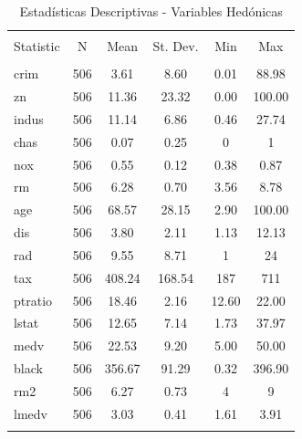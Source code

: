 
\begin{table}[!htbp] \centering 
  \caption{Estadísticas Descriptivas - Variables Hedónicas} 
  \label{} 
\begin{tabular}{@{\extracolsep{5pt}}lccccc} 
\\[-1.8ex]\hline 
\hline \\[-1.8ex] 
Statistic & \multicolumn{1}{c}{N} & \multicolumn{1}{c}{Mean} & \multicolumn{1}{c}{St. Dev.} & \multicolumn{1}{c}{Min} & \multicolumn{1}{c}{Max} \\ 
\hline \\[-1.8ex] 
crim & 506 & 3.61 & 8.60 & 0.01 & 88.98 \\ 
zn & 506 & 11.36 & 23.32 & 0.00 & 100.00 \\ 
indus & 506 & 11.14 & 6.86 & 0.46 & 27.74 \\ 
chas & 506 & 0.07 & 0.25 & 0 & 1 \\ 
nox & 506 & 0.55 & 0.12 & 0.38 & 0.87 \\ 
rm & 506 & 6.28 & 0.70 & 3.56 & 8.78 \\ 
age & 506 & 68.57 & 28.15 & 2.90 & 100.00 \\ 
dis & 506 & 3.80 & 2.11 & 1.13 & 12.13 \\ 
rad & 506 & 9.55 & 8.71 & 1 & 24 \\ 
tax & 506 & 408.24 & 168.54 & 187 & 711 \\ 
ptratio & 506 & 18.46 & 2.16 & 12.60 & 22.00 \\ 
lstat & 506 & 12.65 & 7.14 & 1.73 & 37.97 \\ 
medv & 506 & 22.53 & 9.20 & 5.00 & 50.00 \\ 
black & 506 & 356.67 & 91.29 & 0.32 & 396.90 \\ 
rm2 & 506 & 6.27 & 0.73 & 4 & 9 \\ 
lmedv & 506 & 3.03 & 0.41 & 1.61 & 3.91 \\ 
\hline \\[-1.8ex] 
\end{tabular} 
\end{table} 
